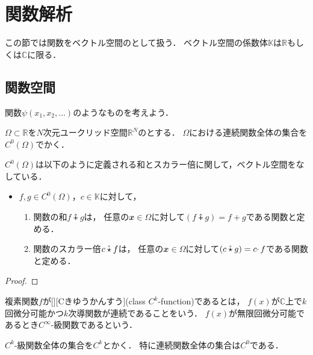 \documentclass[../sotsu.tex]{subfiles}
\begin{document}
\section{関数解析}

この節では関数をベクトル空間のとして扱う．
ベクトル空間の係数体$𝕂$は$ℝ$もしくは$ℂ$に限る．

\subsection{関数空間}

関数$\psi(x_1, x_2, \dotsc)$のようなものを考えよう．

\begin{definition}
    $𝛺 \subset ℝ$を$N$次元ユークリッド空間$ℝ^N$のとする．
    $𝛺$における連続関数全体の集合を$C^0 (𝛺)$でかく．
\end{definition}

\begin{proposition}
    \label{thm:continuous-function-space-is-vector-space}
    $C^0 (𝛺)$は以下のように定義される和とスカラー倍に関して，ベクトル空間をなしている．
    \begin{itemize}
        \item $f, g \in C^0 (𝛺)$，$c \in 𝕂$に対して，
        \begin{enumerate}
            \item 関数の和$f \plushat g$は，
                任意の$𝒙 \in 𝛺$に対して$ ( f \plushat g ) = f + g $である関数と定める．
            \item 関数のスカラー倍$c \mathbin{\hat{\mathbin{\star}}} f$は，
                任意の$𝒙 \in 𝛺$に対して$ ( c \mathbin{\hat{\mathbin{\star}}} g ) = c \cdotp f $である関数と定める．
        \end{enumerate}
    \end{itemize}
\end{proposition}

\begin{proof}
    
\end{proof}



\begin{definition}
    \label{dfn:class-C^k-function}
    複素関数$f$が[][Cきゆうかんすう](class $C^k$-function)であるとは，
    $f(x)$が$ℂ$上で$k$回微分可能かつ$k$次導関数が連続であることをいう．
    $f(x)$が無限回微分可能であるとき$C^\infty$-級関数であるという．

    $C^k$-級関数全体の集合を$C^k$とかく．
    特に連続関数全体の集合は$C^0$である．
\end{definition}
\end{document}

